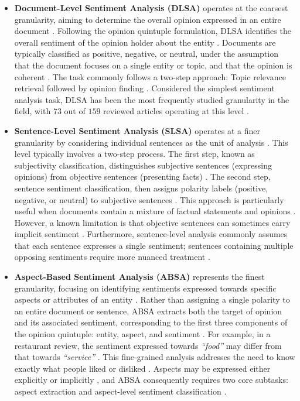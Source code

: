 \documentclass[a4paper,twoside,12pt]{book}
\newcommand{\literal}[1]{\textit{``#1''}}
\begin{document}
\begin{itemize}	
	\item \textbf{Document-Level Sentiment Analysis (DLSA)} operates at the coarsest granularity, aiming to determine the overall opinion expressed in an entire document \cite{behdenna2018document}. Following the opinion quintuple formulation, DLSA identifies the overall sentiment of the opinion holder about the entity \cite{azzeddine2018sentiment}. Documents are typically classified as positive, negative, or neutral, under the assumption that the document focuses on a single entity or topic, and that the opinion is coherent \cite{sharma2025review}. The task commonly follows a two-step approach: Topic relevance retrieval followed by opinion finding \cite{azzeddine2018sentiment, missen2012opinion}. Considered the simplest sentiment analysis task, DLSA has been the most frequently studied granularity in the field, with $73$ out of $159$ reviewed articles operating at this level \cite{azzeddine2018sentiment, ravi2015survey}.
	
	\item \textbf{Sentence-Level Sentiment Analysis (SLSA)} operates at a finer granularity by considering individual sentences as the unit of analysis \cite{behdenna2018document}. This level typically involves a two-step process. The first step, known as subjectivity classification, distinguishes subjective sentences (expressing opinions) from objective sentences (presenting facts) \cite{azzeddine2018sentiment, CHATURVEDI201865}. The second step, sentence sentiment classification, then assigns polarity labels (positive, negative, or neutral) to subjective sentences \cite{azzeddine2018sentiment}. This approach is particularly useful when documents contain a mixture of factual statements and opinions \cite{sharma2025review}. However, a known limitation is that objective sentences can sometimes carry implicit sentiment \cite{behdenna2018document}. Furthermore, sentence-level analysis commonly assumes that each sentence expresses a single sentiment; sentences containing multiple opposing sentiments require more nuanced treatment \cite{azzeddine2018sentiment}.
	
	\item \textbf{Aspect-Based Sentiment Analysis (ABSA)} represents the finest granularity, focusing on identifying sentiments expressed towards specific aspects or attributes of an entity \cite{yadav2020sentiment}. Rather than assigning a single polarity to an entire document or sentence, ABSA extracts both the target of opinion and its associated sentiment, corresponding to the first three components of the opinion quintuple: entity, aspect, and sentiment \cite{behdenna2018document, azzeddine2018sentiment}. For example, in a restaurant review, the sentiment expressed towards \literal{food} may differ from that towards \literal{service} \cite{sharma2025review}. This fine-grained analysis addresses the need to know exactly what people liked or disliked \cite{azzeddine2018sentiment}. Aspects may be expressed either explicitly or implicitly \cite{azzeddine2018sentiment}, and ABSA consequently requires two core subtasks: aspect extraction and aspect-level sentiment classification \cite{sharma2025review}.
\end{itemize}
\end{document}
